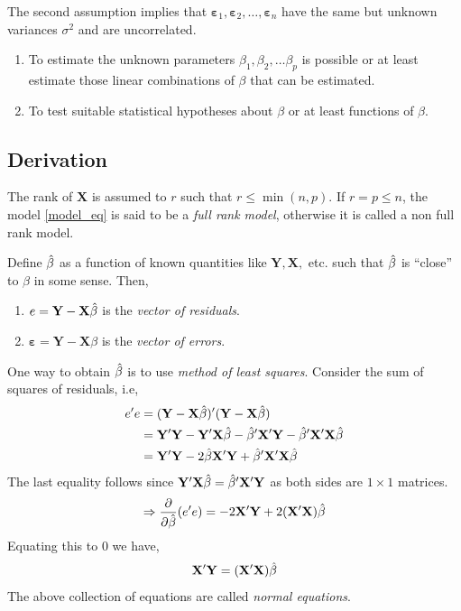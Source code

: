 \documentclass[10pt, a4paper]{article}
\begin{document}
The second assumption implies that \( \mathbf{\varepsilon}_{1}, \mathbf{\varepsilon}_{2}, \dots, \mathbf{\varepsilon}_{n} \) have the same but unknown variances \( \sigma^{2} \) and are uncorrelated.

\begin{objectives}
\begin{enumerate}[1.]
	\item To estimate the unknown parameters \( \beta_{1}, \beta_{2}, \dots \beta_{p} \) is possible or at least estimate those linear combinations of \( \beta \) that can be estimated.
	\item To test suitable statistical hypotheses about \( \beta \) or at least functions of \( \beta \).
\end{enumerate}
\end{objectives}

\subsection{Derivation}
The rank of \( \mathbf{X} \) is assumed to \( r \) such that \( r \leq \min (n, p) \). If \( r = p \leq n \), the model \eqref{model_eq} is said to be a \textit{full rank model}, otherwise it is called a non full rank model.

\begin{definition}
Define \( \hat{\beta} \) as a function of known quantities like \( \mathbf{Y}, \mathbf{X}, \) etc. such that \( \hat{\beta} \) is ``close'' to \( \beta \) in some sense. Then, 
\begin{enumerate}[1.]
	\item \( e = \mathbf{Y} - \mathbf{X}\hat{\beta} \) is the \textit{vector of residuals}.
	\item \( \mathbf{\varepsilon} = \mathbf{Y} - \mathbf{X}\beta \) is the \textit{vector of errors}.
\end{enumerate}
\end{definition}


One way to obtain \( \hat{\beta} \) is to use \textit{method of least squares}. 
Consider the sum of squares of residuals, i.e, 
\begin{align*}
	e'e &= (\mathbf{Y} - \mathbf{X}\hat{\beta})'(\mathbf{Y} - \mathbf{X}\hat{\beta}) \\
	    &= \mathbf{Y}'\mathbf{Y} - \mathbf{Y}'\mathbf{X}\hat{\beta} - \hat{\beta}'\mathbf{X}'\mathbf{Y} - \hat{\beta}'\mathbf{X}'\mathbf{X}\hat{\beta} \\
	    &= \mathbf{Y}'\mathbf{Y} - 2\hat{\beta} \mathbf{X}'\mathbf{Y} + \hat{\beta}'\mathbf{X}'\mathbf{X}\hat{\beta}
\end{align*}
The last equality follows since \( \mathbf{Y}'\mathbf{X}\hat{\beta} = \hat{\beta}'\mathbf{X}'\mathbf{Y} \) as both sides are \( 1 \times 1 \) matrices.
\[ \Rightarrow \frac{\partial }{\partial \hat{\beta}} (e'e) = -2\mathbf{X}'\mathbf{Y} + 2(\mathbf{X}'\mathbf{X})\hat{\beta} \] 
Equating this to \( 0 \) we have, 
\begin{equation}
	\mathbf{X}'\mathbf{Y} = (\mathbf{X}'\mathbf{X}) \hat{\beta} \label{normal_eq}
\end{equation}
The above collection of equations are called \textit{normal equations}.
\end{document}
